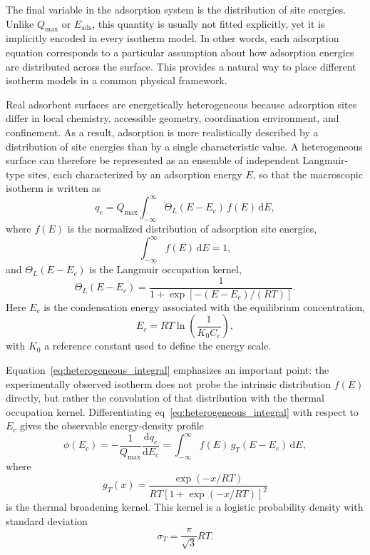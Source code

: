 \documentclass[journal=jacsat,manuscript=article]{achemso}
\begin{document}
	The final variable in the adsorption system is the distribution of site energies. Unlike $Q_{\max}$ or $E_{\mathrm{ads}}$, this quantity is usually not fitted explicitly, yet it is implicitly encoded in every isotherm model. In other words, each adsorption equation corresponds to a particular assumption about how adsorption energies are distributed across the surface. This provides a natural way to place different isotherm models in a common physical framework.
	
	Real adsorbent surfaces are energetically heterogeneous because adsorption sites differ in local chemistry, accessible geometry, coordination environment, and confinement. As a result, adsorption is more realistically described by a distribution of site energies than by a single characteristic value. A heterogeneous surface can therefore be represented as an ensemble of independent Langmuir-type sites, each characterized by an adsorption energy $E$, so that the macroscopic isotherm is written as
	\begin{equation}
		q_e
		=
		Q_{\max}
		\int_{-\infty}^{\infty}
		\Theta_L(E-E_c)\, f(E)\,\mathrm{d}E,
		\label{eq:heterogeneous_integral}
	\end{equation}
	where $f(E)$ is the normalized distribution of adsorption site energies,
	\begin{equation}
		\int_{-\infty}^{\infty} f(E)\,\mathrm{d}E = 1,
	\end{equation}
	and $\Theta_L(E-E_c)$ is the Langmuir occupation kernel,
	\begin{equation}
		\Theta_L(E-E_c)
		=
		\frac{1}{1+\exp\!\left[-(E-E_c)/(RT)\right]}.
		\label{eq:langmuir_kernel_energy}
	\end{equation}
	Here $E_c$ is the condensation energy associated with the equilibrium concentration,
	\begin{equation}
		E_c = RT\ln\!\left(\frac{1}{K_0 C_e}\right),
		\label{eq:condensation_energy}
	\end{equation}
	with $K_0$ a reference constant used to define the energy scale.
	
	Equation~\eqref{eq:heterogeneous_integral} emphasizes an important point: the experimentally observed isotherm does not probe the intrinsic distribution $f(E)$ directly, but rather the convolution of that distribution with the thermal occupation kernel. Differentiating eq~\eqref{eq:heterogeneous_integral} with respect to $E_c$ gives the observable energy-density profile
	\begin{equation}
		\phi(E_c)
		=
		-\frac{1}{Q_{\max}}\frac{\mathrm{d}q_e}{\mathrm{d}E_c}
		=
		\int_{-\infty}^{\infty}
		f(E)\, g_T(E-E_c)\,\mathrm{d}E,
		\label{eq:observable_distribution}
	\end{equation}
	where
	\begin{equation}
		g_T(x)
		=
		\frac{\exp(-x/RT)}
		{RT\left[1+\exp(-x/RT)\right]^2}
		\label{eq:thermal_kernel}
	\end{equation}
	is the thermal broadening kernel. This kernel is a logistic probability density with standard deviation
	\begin{equation}
		\sigma_T = \frac{\pi}{\sqrt{3}}RT.
		\label{eq:thermal_sigma}
	\end{equation}
	
\end{document}
